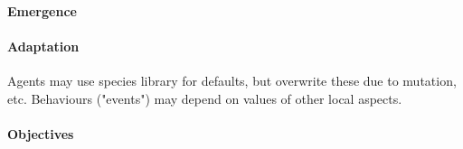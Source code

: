 \documentclass[10pt,letterpaper]{article}
\begin{document}
\paragraph{Emergence}

\paragraph{Adaptation}
Agents may use species library for defaults, but overwrite these due to mutation, etc. Behaviours ("events") may depend on values of other local aspects.

\paragraph{Objectives}

\end{document}
